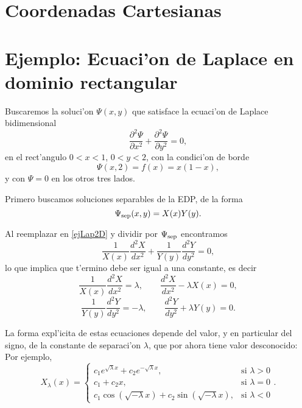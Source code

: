 \section{Coordenadas Cartesianas}
\section{Ejemplo: Ecuaci'on de Laplace en dominio rectangular}
Buscaremos la soluci'on $\Psi(x,y)$ que satisface la ecuaci'on de Laplace bidimensional
\begin{equation}\label{ejLap2D}
\frac{\partial^2\Psi }{\partial x^2}+\frac{\partial^2\Psi }{\partial y^2}=0,
\end{equation}
en el rect'angulo $0<x<1$, $0<y<2$, con la condici'on de borde
\begin{equation}
\Psi(x,2) = f(x) = x(1-x), 
\end{equation}
y con $\Psi=0$ en los otros tres lados. 

Primero buscamos soluciones separables de la EDP, de la forma
\begin{equation}
\Psi_{\rm sep}(x,y)=X(x)Y(y).
\end{equation}

Al reemplazar en \eqref{ejLap2D} y dividir por $\Psi_{\rm sep}$ encontramos
\begin{equation}
\frac{1}{X(x)}\frac{d^2X}{dx^2}+\frac{1}{Y(y)}\frac{d^2Y}{dy^2} = 0,
\end{equation}
lo que implica que t'ermino debe ser igual a una constante, es decir
\begin{equation}
\frac{1}{X(x)}\frac{d^2X}{dx^2} = \lambda, \qquad \frac{d^2X}{dx^2}-\lambda X(x)=0,
\end{equation}
\begin{equation}
\frac{1}{Y(y)}\frac{d^2Y}{dy^2} = -\lambda, \qquad \frac{d^2Y}{dy^2}+\lambda Y(y)=0.
\end{equation}

La forma expl'icita de estas ecuaciones depende del valor, y en particular del signo, de la constante de separaci'on $\lambda$, que por ahora tiene valor desconocido: Por ejemplo,
\begin{equation}
X_\lambda(x)= 	\begin{cases}
		c_1e^{\sqrt{\lambda}x} + c_2e^{-\sqrt{\lambda}x}, & \text{si }\lambda>0 \\
		c_1 + c_2x,  & \text{si } \lambda=0 \\
		c_1\cos(\sqrt{-\lambda}x) + c_2\sin(\sqrt{-\lambda}x), & \text{si } \lambda<0
		\end{cases}.
\end{equation}

